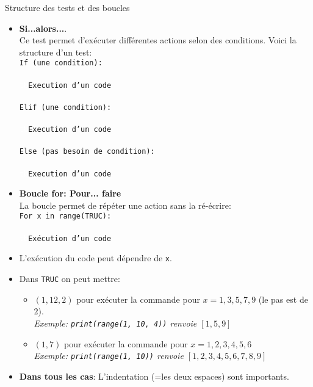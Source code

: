 \documentclass[a4paper, 8pt]{article}
\theoremstyle{definition}
\begin{document}
\begin{bclogo}[logo = \bccrayon, arrondi = 0.1, noborder = true]{\textcolor{redStruc}{Structure des tests et des boucles}}

\begin{itemize}[font= \color{redStruc} \small , label = \textbullet ]

\item \textbf{Si...alors...}.
\\Ce test permet d'exécuter différentes actions selon des conditions. Voici la structure d'un test:
\\
\texttt{If (une condition):\\
\\ \textcolor{white}{tb}Execution d'un code\\
\\ Elif (une condition):\\\\
\textcolor{white}{tb}Execution d'un code\\
\\ Else (pas besoin de condition):\\\\
\textcolor{white}{tb}Execution d'un code}


\item  \textbf{Boucle for: Pour... faire}
\\La boucle permet de répéter une action sans la ré-écrire:
\\ \texttt{For x in range(TRUC):\\\\
\textcolor{white}{tb}Exécution d'un code}
\item L'exécution du code peut dépendre de \texttt{x}.
\item Dans \texttt{TRUC} on peut mettre:
\begin{itemize}[font= \color{redStruc} \small , label = \textbullet ]
\item $\left(1,12,2\right)$ pour exécuter la commande pour $x=1,3,5,7,9$ (le pas est de $2$).
\\\textit{Exemple: \texttt{print(range(1, 10, 4))} renvoie $\left[ 1,5,9\right]$ }
\item $\left(1,7\right)$ pour exécuter la commande pour $x=1,2,3,4,5,6$
\\\textit{Exemple: \texttt{print(range(1, 10))} renvoie $\left[ 1,2,3,4,5,6,7,8,9\right]$}
\end{itemize}
\item \bcattention \textbf{Dans tous les cas}: L'indentation (=les deux espaces) sont importants.
\end{itemize}




\end{bclogo}
\end{document}
